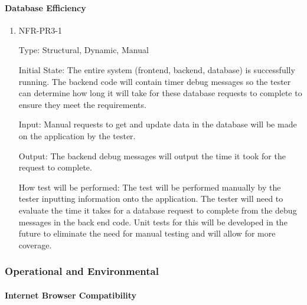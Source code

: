 \documentclass[12pt, titlepage]{article}
\begin{document}
\paragraph{Database Efficiency}

\begin{enumerate}

\item{NFR-PR3-1\\}

Type: Structural, Dynamic, Manual
					
Initial State: The entire system (frontend, backend, database) is successfully running. The backend code will contain timer debug messages so the tester can determine how long it will take for these database requests to complete to ensure they meet the requirements.
					
Input: Manual requests to get and update data in the database will be made on the application by the tester.
					
Output: The backend debug messages will output the time it took for the request to complete.
					
How test will be performed: The test will be performed manually by the tester inputting information onto the application. The tester will need to evaluate the time it takes for a database request to complete from the debug messages in the back end code. Unit tests for this will be developed in the future to eliminate the need for manual testing and will allow for more coverage.

\end{enumerate}

\subsubsection{Operational and Environmental}

\paragraph{Internet Browser Compatibility}
\end{document}
